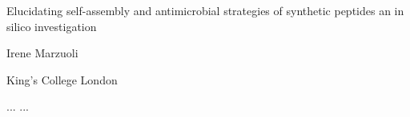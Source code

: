 \begin{center}

{\Large\sffamily Elucidating self-assembly and antimicrobial strategies of synthetic peptides an in silico investigation}

\vspace{.2cm}

{\large\sffamily Irene Marzuoli}

\vspace{.03cm}

{\large\sffamily King's College London}
%
\vspace{.2cm}

\end{center}
%
\noindent
%
...
%
...

\cleardoublepage
\newpage
\thispagestyle{plain} %
\mbox{}

 
\tableofcontents*

\cleardoublepage

\listoffigures*

\cleardoublepage

\listoftables*



\newlength{\nomitemorigsep}
\setlength{\nomitemorigsep}{\nomitemsep}
\setlength{\nomitemsep}{-\parsep}

\renewcommand{\nomgroup}[1]{
%
\itemsep\nomitemorigsep
\ifthenelse{\equal{#1}{A}}{\item[\textbf{Acronyms}]}{
%
\ifthenelse{\equal{#1}{B}}{\item[\textbf{ccc}]}{
%
\ifthenelse{\equal{#1}{K}}{\item[\textbf{vvv}]}{
}}}
\itemsep\nomitemsep}


\printnomenclature[7.6em]

\cleardoublepage
\newpage
\thispagestyle{plain} %
\mbox{}


\thispagestyle{empty}





